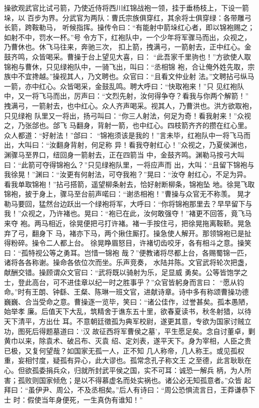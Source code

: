 操欲观武官比试弓箭，乃使近侍将西川红锦战袍一领，挂于垂杨枝上，下设一箭垛，以
百步为界。分武官为两队：曹氏宗族俱穿红，其余将士俱穿绿：各带雕弓长箭，跨鞍勒马，
听候指挥。操传令曰：“有能射中箭垛红心者，即以锦袍赐之；如射不中，罚水一杯。”号
令方下，红袍队中，一个少年将军骤马而出，众视之，乃曹休也。休飞马往来，奔驰三次，
扣上箭，拽满弓，一箭射去，正中红心。金鼓齐鸣，众皆喝采。曹操于台上望见大喜，曰：
“此吾家千里驹也！”方欲使人取锦袍与曹休，只见绿袍队中，一骑飞出，叫曰：“丞相锦
袍，合让俺外姓先取，宗族中不宜搀越。”操视其人，乃文聘也。众官曰：“且看文仲业射
法。”文聘拈弓纵马一箭，亦中红心。众皆喝采，金鼓乱鸣。聘大呼曰：“快取袍来！”只
见红袍队中，又一将飞马而出，厉声曰：“文烈先射，汝何得争夺？看我与你两个解箭！”
拽满弓，一箭射去，也中红心。众人齐声喝采。视其人，乃曹洪也。洪方欲取袍，只见绿袍
队里又一将出，扬弓叫曰：“你三人射法，何足为奇！看我射来！”众视之，乃张郃也。郃飞
马翻身，背射一箭，也中红心。四枝箭齐齐的攒在红心里。众人都道：“好射法！”郃曰：
“锦袍须该是我的！”言未毕，红袍队中一将飞马而出，大叫曰：“汝翻身背射，何足称
异！看我夺射红心！”众视之，乃夏侯渊也，渊骤马至界口，纽回身一箭射去，正在四箭当
中，金鼓齐鸣。渊勒马按弓大叫曰：“此箭可夺得锦袍么？”只见绿袍队里，一将应声而
出，大叫：“且留下锦袍与我徐晃！”渊曰：“汝更有何射法，可夺我袍？”晃曰：“汝夺
射红心，不足为异。看我单取锦袍！”拈弓搭箭，遥望柳条射去，恰好射断柳条，锦袍坠
地。徐晃飞取锦袍，披于身上，骤马至台前声喏曰：“谢丞相袍！”曹操与众官无不称羡。
晃才勒马要回，猛然台边跃出一个绿袍将军，大呼曰：“你将锦袍那里去？早早留下与
我！”众视之，乃许褚也。晃曰：“袍已在此，汝何敢强夺！”褚更不回答，竟飞马来夺
袍。两马相近，徐晃便把弓打许褚。褚一手按住弓，把徐晃拖离鞍鞒。晃急弃了弓，翻身下
马，褚亦下马，两个揪住厮打。操急使人解开。那领锦袍已是扯得粉碎。操令二人都上台。
徐晃睁眉怒目，许褚切齿咬牙，各有相斗之意。操笑曰：“孤特视公等之勇耳。岂惜一锦袍
哉？”便教诸将尽都上台，各赐蜀锦一匹，诸将各各称谢。操命各依位次而坐。乐声竞奏，
水陆并陈。文官武将轮次把盏，献酬交错。操顾谓众文官曰：“武将既以骑射为乐，足显威
勇矣。公等皆饱学之士，登此高台，可不进佳章以纪一时之胜事乎？”众官皆躬身而言曰：
“愿从钧命。”时有王朗、钟繇、王粲、陈琳一班文官，进献诗章。诗中多有称颂曹操功德
巍巍、合当受命之意。曹操逐一览毕，笑曰：“诸公佳作，过誉甚矣。孤本愚陋，始举孝
廉。后值天下大乱，筑精舍于谯东五十里，欲春夏读书，秋冬射猎，以待天下清平，方出仕
耳。不意朝廷徵孤为典军校尉，遂更其意，专欲为国家讨贼立功，图死后得题墓道曰：‘汉
故征西将军曹侯之墓’，平生愿足矣。念自讨董卓，剿黄巾以来，除袁术、破吕布、灭袁
绍、定刘表，遂平天下。身为宰相，人臣之贵已极，又复何望哉？如国家无孤一人，正不知
几人称帝，几人称王。或见孤权重，妄相忖度，疑孤有异心，此大谬也。孤常念孔子称文王
之至德，此言耿耿在心。但欲孤委捐兵众，归就所封武平侯之国，实不可耳：诚恐一解兵
柄，为人所害；孤败则国家倾危；是以不得慕虚名而处实祸也。诸公必无知孤意者。”众皆
起拜曰：“虽伊尹、周公，不及丞相矣。”后人有诗曰：“周公恐惧流言日，王莽谦恭下士
时：假使当年身便死，一生真伪有谁知！”

